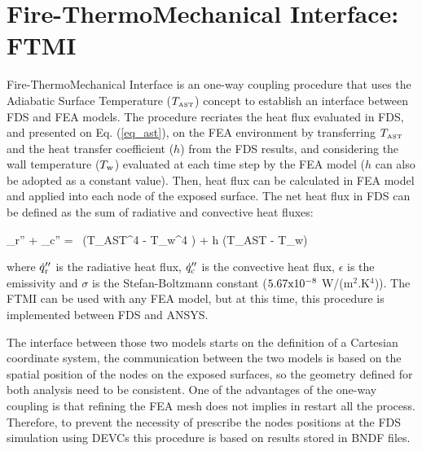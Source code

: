 \documentclass[12pt]{article}
\begin{document}
\vspace{1.0in}
\section{Fire-ThermoMechanical Interface: FTMI}

Fire-ThermoMechanical Interface is an one-way coupling procedure that uses the Adiabatic Surface Temperature ($T_{\hbox{\tiny AST}}$) concept to establish an interface between FDS and FEA models.
The procedure recriates the heat flux evaluated in FDS, and presented on Eq. (\ref{eq_ast}), on the FEA environment by transferring $T_{\hbox{\tiny AST}}$ and the heat transfer coefficient ($h$) from the FDS results,
and considering the wall temperature ($T_{\rm w}$) evaluated at each time step by the FEA model ($h$ can also be adopted as a constant value).
Then, heat flux can be calculated in FEA model and applied into each node of the exposed surface. The net heat flux in FDS can be defined as the sum of radiative and convective heat fluxes:

\be \label{eq_ast} _{\rm r}'' + _{\rm c}'' = \epsilon \sigma \, \left(T_{\hbox{\tiny AST}}^4 - T_{\rm w}^4 \right) + h (T_{\hbox{\tiny AST}} - T_{\rm w})  \ee

\noindent where $\dot{q}_{\rm r}''$ is the radiative heat flux, $\dot{q}_{\rm c}''$ is the convective heat flux, $\epsilon$ is the emissivity and $\sigma$ is the Stefan-Boltzmann constant ($5.67{\rm x}10^{-8}$ W/(m$^2$.K$^4$)).
The FTMI can be used with any FEA model, but at this time, this procedure is implemented between FDS and A{\footnotesize NSYS}.

The interface between those two models starts on the definition of a Cartesian coordinate system, the communication between the two models is based on the spatial position of the nodes on the exposed surfaces,
so the geometry defined for both analysis need to be consistent. One of the advantages of the one-way coupling is that refining the FEA mesh does not implies in restart all the process.
Therefore, to prevent the necessity of prescribe the nodes positions at the FDS simulation using {\ct DEVC}s this procedure is based on results stored in {\ct BNDF} files.
\end{document}
